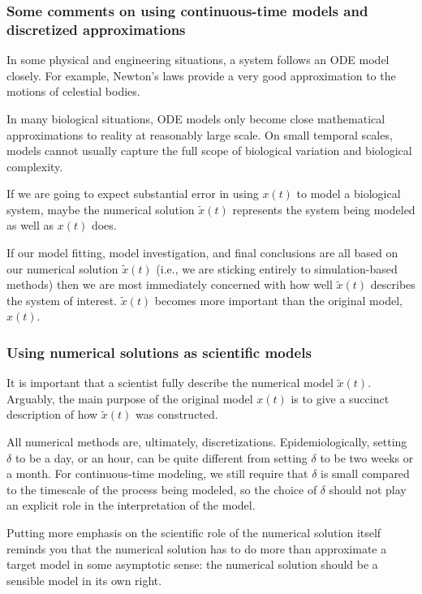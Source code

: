 \documentclass{beamer}\usepackage[]{graphicx}\usepackage[]{color}
\begin{document}
\begin{frame}[fragile]

\frametitle{Some comments on using continuous-time models and discretized approximations}

\bi
\item In some physical and engineering situations, a system follows an ODE model closely. For example, Newton's laws provide a very good approximation to the motions of celestial bodies. 

\item In many biological situations, ODE models only become close mathematical approximations to reality at reasonably large scale. On small temporal scales, models cannot usually capture the full scope of biological variation and biological complexity. 

\item If we are going to expect substantial error in using $x(t)$ to model a biological system, maybe the numerical solution $\tilde x(t)$ represents the system being modeled as well as $x(t)$  does.

\item If our model fitting, model investigation, and final conclusions are all based on our numerical solution  $\tilde x(t)$ (i.e., we are sticking entirely to simulation-based methods) then we are most immediately concerned with how well  $\tilde x(t)$ describes the system of interest.  $\tilde x(t)$ becomes more important than the original model, $x(t)$.

\ei

\end{frame}
\begin{frame}[fragile]

\frametitle{Using numerical solutions as scientific models}
\bi
\item It is important that a scientist fully describe the numerical model $\tilde x(t)$. 
Arguably, the main purpose of the original model $x(t)$ is to give a succinct description of how $\tilde x(t)$ was constructed.

\item All numerical methods are, ultimately, discretizations. Epidemiologically, setting $\delta$ to be a day, or an hour, can be quite different from setting $\delta$ to be two weeks or a month. For continuous-time modeling, we still require that $\delta$ is small compared to the timescale of the process being modeled, so the choice of $\delta$ should not play an explicit role in the interpretation of the model.

\item Putting more emphasis on the scientific role of the numerical solution itself reminds you that the numerical solution has to do more than approximate a target model in some asymptotic sense: the numerical solution should be a sensible model in its own right. 

\ei

\end{frame}
\end{document}
